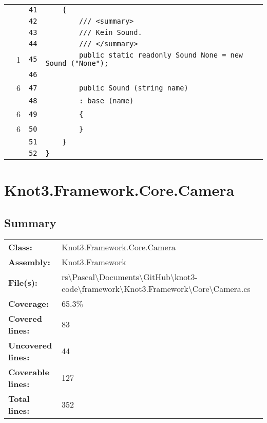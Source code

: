 \documentclass[a4paper,10pt]{article}
\begin{document}
\begin{longtable}[l]{lrrl}
\cellcolor{gray} &  & \verb~41~ & \verb~    {~\\
\cellcolor{gray} &  & \verb~42~ & \verb~        /// <summary>~\\
\cellcolor{gray} &  & \verb~43~ & \verb~        /// Kein Sound.~\\
\cellcolor{gray} &  & \verb~44~ & \verb~        /// </summary>~\\
\cellcolor{green} & 1 & \verb~45~ & \verb~        public static readonly Sound None = new Sound ("None");~\\
\cellcolor{gray} &  & \verb~46~ & \verb~~\\
\cellcolor{green} & 6 & \verb~47~ & \verb~        public Sound (string name)~\\
\cellcolor{gray} &  & \verb~48~ & \verb~        : base (name)~\\
\cellcolor{green} & 6 & \verb~49~ & \verb~        {~\\
\cellcolor{green} & 6 & \verb~50~ & \verb~        }~\\
\cellcolor{gray} &  & \verb~51~ & \verb~    }~\\
\cellcolor{gray} &  & \verb~52~ & \verb~}~\\
\end{longtable}
\newpage
\section{Knot3.Framework.Core.Camera}
\subsection{Summary}
\begin{longtable}[l]{ll}
\textbf{Class:} & Knot3.Framework.Core.Camera\\
\textbf{Assembly:} & Knot3.Framework\\
\textbf{File(s):} & \begin{minipage}[t]{12cm}{rs\textbackslash Pascal\textbackslash Documents\textbackslash GitHub\textbackslash knot3-code\textbackslash framework\textbackslash Knot3.Framework\textbackslash Core\textbackslash Camera.cs}\end{minipage} \\
\textbf{Coverage:} & 65.3\%\\
\textbf{Covered lines:} & 83\\
\textbf{Uncovered lines:} & 44\\
\textbf{Coverable lines:} & 127\\
\textbf{Total lines:} & 352\\
\end{longtable}
\end{document}
